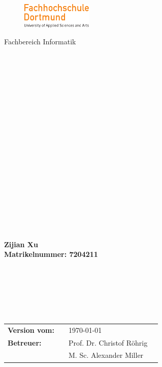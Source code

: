 \thispagestyle{empty}


\begin{figure}[t]
 \centering
 \includegraphics[width=0.3\textwidth]{assets/fhlogo.pdf}
\end{figure}







\begin{center}
\Large{Fachbereich Informatik}
\end{center}
\begin{verbatim}










\end{verbatim}
\begin{center}
\doublespacing
\textbf{\LARGE{\subjectDocument}}\\
\singlespacing
\begin{verbatim}




\end{verbatim}
\textbf{\Large{~\titleDocument}}
\end{center}
\begin{verbatim}


\end{verbatim}
\begin{center}
\textbf{\large{Zijian Xu \\ Matrikelnummer: 7204211}}
\end{center}
\begin{verbatim}






\end{verbatim}
\begin{flushleft}
\begin{tabular}{llll}
\textbf{Version vom:} & & \today &\\
\textbf{Betreuer:} & & Prof. Dr. Christof Röhrig &\\
    & & M. Sc. Alexander Miller &\\
\end{tabular}
\end{flushleft}
